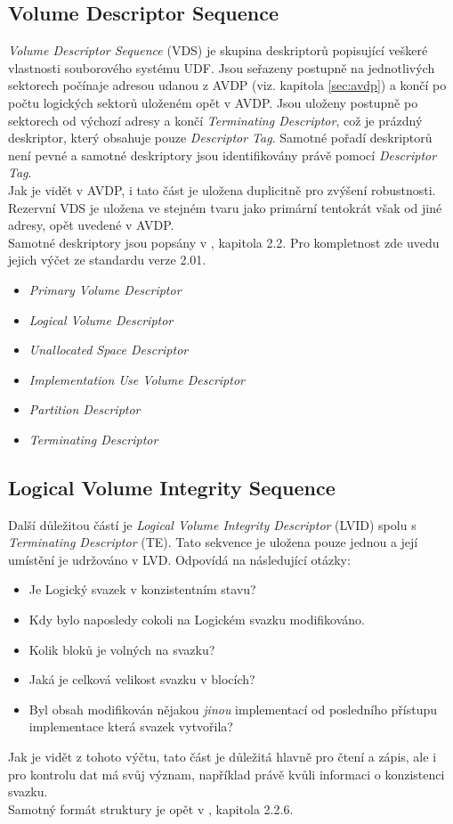 \subsection{Volume Descriptor Sequence}
\label{sec:vds}
\textit{Volume Descriptor Sequence} (VDS) je skupina deskriptorů popisující veškeré vlastnosti souborového systému UDF. Jsou seřazeny postupně na jednotlivých sektorech počínaje adresou udanou z AVDP (viz. kapitola \ref{sec:avdp}) a končí po počtu logických sektorů uloženém opět v AVDP. Jsou uloženy postupně po sektorech od výchozí adresy a končí \textit{Terminating Descriptor}, což je prázdný deskriptor, který obsahuje pouze \textit{Descriptor Tag}. Samotné pořadí deskriptorů není pevné a samotné deskriptory jsou identifikovány právě pomocí \textit{Descriptor Tag}.\\
Jak je vidět v AVDP, i tato část je uložena duplicitně pro zvýšení robustnosti. Rezervní VDS je uložena ve stejném tvaru jako primární tentokrát však od jiné adresy, opět uvedené v AVDP.\\
Samotné deskriptory jsou popsány v \cite{osta-udf-0201}, kapitola 2.2. Pro kompletnost zde uvedu jejich výčet ze standardu verze 2.01.
\begin{itemize}
    \item \textit{Primary Volume Descriptor}
    \item \textit{Logical Volume Descriptor}
    \item \textit{Unallocated Space Descriptor}
    \item \textit{Implementation Use Volume Descriptor}
    \item \textit{Partition Descriptor}
    \item \textit{Terminating Descriptor}
\end{itemize}

\subsection{Logical Volume Integrity Sequence}
\label{sec:lvid}
Další důležitou částí je \textit{Logical Volume Integrity Descriptor} (LVID) spolu s \textit{Terminating Descriptor} (TE). Tato sekvence je uložena pouze jednou a její umístění je udržováno v LVD. Odpovídá na následující otázky:
\begin{itemize}
    \item Je Logický svazek v konzistentním stavu?
    \item Kdy bylo naposledy cokoli na Logickém svazku modifikováno.
    \item Kolik bloků je volných na svazku?
    \item Jaká je celková velikost svazku v blocích?
    \item Byl obsah modifikován nějakou \textit{jinou} implementací od posledního přístupu implementace která svazek vytvořila?
\end{itemize}
Jak je vidět z tohoto výčtu, tato část je důležitá hlavně pro čtení a zápis, ale i pro kontrolu dat má svůj význam, například právě kvůli informaci o konzistenci svazku.\\ 
Samotný formát struktury je opět v \cite{osta-udf-0201}, kapitola 2.2.6.

